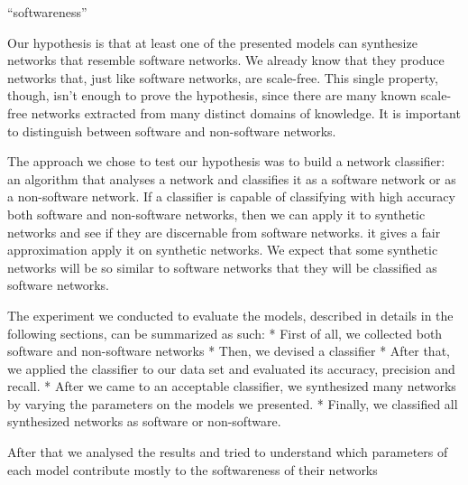 ``softwareness''

Our hypothesis is that at least one of the presented models can synthesize
networks that resemble software networks. We already know that they produce
networks that, just like software networks, are scale-free. This single
property, though, isn't enough to prove the hypothesis, since there are many
known scale-free networks extracted from many distinct domains of knowledge. It
is important to distinguish between software and non-software networks.


The approach we chose to test our hypothesis was to build a network classifier:
an algorithm that analyses a network and classifies it as a software network or
as a non-software network. If a classifier is capable of classifying with high
accuracy both software and non-software networks, then we can apply it to
synthetic networks and see if they are discernable from software networks.
it gives a fair approximation apply it on synthetic networks. We expect that
some synthetic networks will be so similar to software networks that they will
be classified as software networks.

The experiment we conducted to evaluate the models, described in details in the
following sections, can be summarized as such:
* First of all, we collected both software and non-software networks
* Then, we devised a classifier
* After that, we applied the classifier to our data set and evaluated its
accuracy, precision and recall.
* After we came to an acceptable classifier, we synthesized many networks by
varying the parameters on the models we presented.
* Finally, we classified all synthesized networks as software or non-software.

After that we analysed the results and tried to understand which parameters
of each model contribute mostly to the softwareness of their networks


